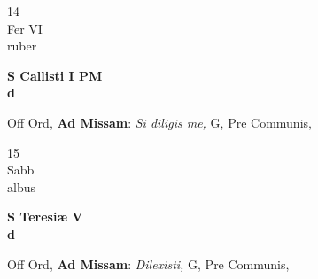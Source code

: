 \documentclass[10pt, openany]{book}
\begin{document}
        \begin{center}
            \begin{minipage}{3.5in}
                \vspace{2em}
                \begin{minipage}{0.5in}
                    {\Huge 14} \\
                    {\normalsize Fer VI} \\
                    {\normalsize ruber}
                \end{minipage}
                \begin{minipage}{3.0in}
                    \textbf{ \large S Callisti I PM \\
                    \textnormal{\normalsize d}} \\ 
                \end{minipage}
                \begin{justify}Off Ord, \textbf{Ad Missam}: \textit{Si diligis me,} G, Pre Communis,   
                \end{justify}
            \end{minipage}
        \end{center}
    
        \begin{center}
            \begin{minipage}{3.5in}
                \vspace{2em}
                \begin{minipage}{0.5in}
                    {\Huge 15} \\
                    {\normalsize Sabb} \\
                    {\normalsize albus}
                \end{minipage}
                \begin{minipage}{3.0in}
                    \textbf{ \large S Teresiæ V \\
                    \textnormal{\normalsize d}} \\ 
                \end{minipage}
                \begin{justify}Off Ord, \textbf{Ad Missam}: \textit{Dilexisti,} G, Pre Communis,   
                \end{justify}
            \end{minipage}
        \end{center}
    
\end{document}
